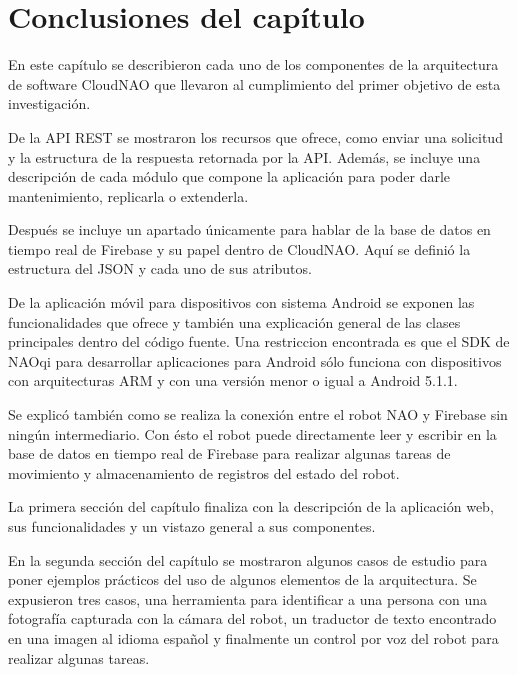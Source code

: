 \documentclass[letterpaper,12pt,spanish]{report}
\begin{document}
\section*{Conclusiones del capítulo}
En este capítulo se describieron cada uno de los
componentes de la arquitectura de software CloudNAO que llevaron al
cumplimiento del primer objetivo
de esta investigación. 

De la API REST se mostraron los recursos que ofrece, como enviar una solicitud y la estructura de la respuesta 
retornada por la API. Además, se incluye una descripción
de cada módulo que compone la aplicación para poder
darle mantenimiento, replicarla o extenderla.

Después se incluye un apartado únicamente para
hablar de la base de datos en tiempo real de Firebase
y su papel dentro de CloudNAO. Aquí se definió 
la estructura del JSON y cada uno de sus atributos.

De la aplicación móvil para dispositivos con
sistema Android se exponen las funcionalidades que 
ofrece y también una explicación general de las 
clases principales dentro del código fuente. Una restriccion
encontrada es que el SDK de NAOqi
para desarrollar aplicaciones para
Android sólo funciona con 
dispositivos con arquitecturas ARM
y con una versión menor o igual a Android 5.1.1.

Se explicó también como se realiza la conexión 
entre el robot NAO y Firebase sin ningún intermediario. Con ésto el
robot puede directamente
leer y escribir en la base
de datos en tiempo real de Firebase
para realizar algunas tareas de 
movimiento y almacenamiento de
registros del estado del robot.

La primera sección del capítulo finaliza con la descripción de
la aplicación web, sus funcionalidades y un vistazo general
a sus componentes.

En la segunda sección del capítulo
se mostraron algunos casos de estudio para poner ejemplos
prácticos del uso de algunos elementos de la arquitectura.
Se expusieron tres casos, una herramienta para
identificar a una persona con una
fotografía capturada con la cámara
del robot, un traductor de texto
encontrado en una imagen
al idioma español y finalmente 
un control por voz del robot
para realizar algunas tareas.



\end{document}
